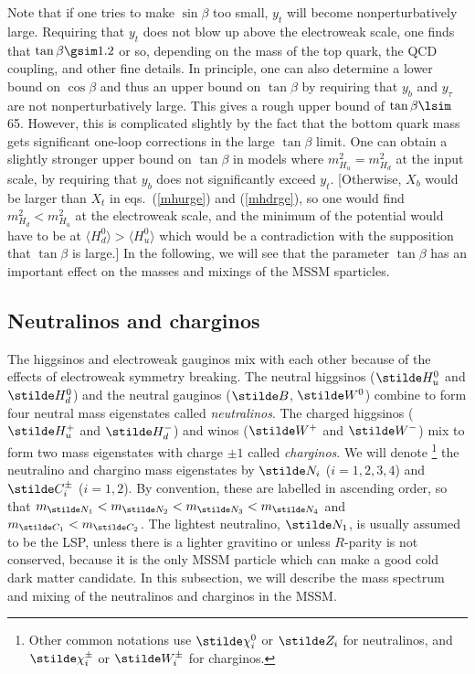 Note that if one tries to make $\sin\beta$ too small, $y_t$ will become
nonperturbatively
large. Requiring that $y_t$ does not blow up above the electroweak scale,
one finds that $\tan\beta \gsim 1.2$ or so, depending on the mass of
the top quark, the QCD coupling, and other fine details. In principle,
one can also determine a lower bound on $\cos\beta$ and thus an upper bound
on $\tan\beta$ by requiring that $y_b$ and $y_\tau$ are not
nonperturbatively large.
This gives a rough upper
bound of $\tan\beta \lsim$ 65.
However, this is complicated slightly by the fact
that the bottom quark mass gets significant one-loop corrections in the
large $\tan\beta$ limit.\cite{copw} One can obtain a slightly
stronger upper bound on $\tan\beta$ in models where
$m_{H_u}^2 = m_{H_d}^2$ at the input scale, by requiring that $y_b$
does not significantly exceed $y_t$. [Otherwise,
$X_b$ would be larger than $X_t$ in eqs.~(\ref{mhurge})
and (\ref{mhdrge}), so one would find $m_{H_d}^2 <
m_{H_u}^2$ at the electroweak scale,
and the minimum of the potential would
have to be at $\langle H_d^0 \rangle >  \langle H_u^0 \rangle$ which
would be a contradiction
with the supposition that $\tan\beta$ is large.]
In the following, we will see that the parameter $\tan\beta$ has an
important effect on the masses and mixings of the MSSM sparticles.

\subsection{Neutralinos and charginos}\label{subsec:MSSMspectrum.inos}

The higgsinos and electroweak gauginos
mix with each other because of the effects of electroweak symmetry
breaking.
The neutral higgsinos ($\stilde H_u^0$ and $\stilde H_d^0$) and the
neutral gauginos ($\stilde B$, $\stilde W^0$) combine to form four
neutral mass eigenstates called {\it neutralinos}.
The charged higgsinos ($\stilde H_u^+$ and $\stilde H_d^-$)
and winos ($\stilde W^+$ and $\stilde W^-$) mix to form two
mass eigenstates with charge $\pm 1$ called {\it charginos}.
We will denote
\footnote{Other common notations use
$\stilde \chi_i^0$ or $\stilde Z_i$ for neutralinos,
and $\stilde \chi^\pm_i$ or $\stilde W^\pm_i$ for charginos.}
the neutralino and chargino mass eigenstates by
$\stilde N_i$ ($i=1,2,3,4$) and $\stilde C^\pm_i$ ($i=1,2$).
By convention, these are labelled in ascending order, so that 
$m_{\stilde N_1}
< m_{\stilde N_2} <m_{\stilde N_3} <m_{\stilde N_4}$ and
$m_{\stilde C_1} < m_{\stilde C_2}$. The lightest neutralino,
$\stilde N_1$, is usually assumed to
be the LSP, unless there is a lighter
gravitino or unless $R$-parity is not conserved, because it is the
only MSSM particle which can make a good cold dark matter candidate.
In
this subsection,
we will describe the mass spectrum and mixing of the neutralinos
and charginos in the MSSM.

